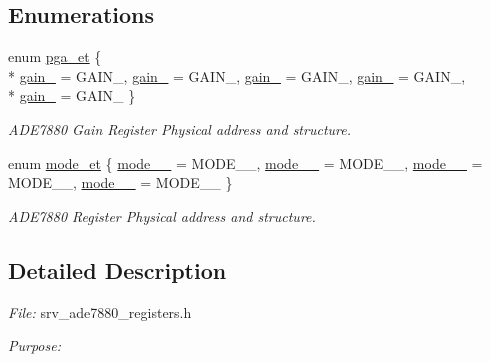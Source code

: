 \subsection*{Enumerations}
\begin{DoxyCompactItemize}
\item 
enum \hyperlink{a00036_ad9e71b7c5a4b7598dfea38b40734d96f}{pga\-\_\-et} \{ \\*
\hyperlink{a00036_ad9e71b7c5a4b7598dfea38b40734d96faf1e9db7d59697c4bc5aaf0d676ca7082}{gain\-\_} = G\-A\-I\-N\-\_, 
\hyperlink{a00036_ad9e71b7c5a4b7598dfea38b40734d96fa89a8362915be3315ce14b4d312cc057c}{gain\-\_} = G\-A\-I\-N\-\_, 
\hyperlink{a00036_ad9e71b7c5a4b7598dfea38b40734d96fa123644a6f475acf380a483a7698909eb}{gain\-\_} = G\-A\-I\-N\-\_, 
\hyperlink{a00036_ad9e71b7c5a4b7598dfea38b40734d96fa3d11d3d6aa9f04465f98def5062b3468}{gain\-\_} = G\-A\-I\-N\-\_, 
\\*
\hyperlink{a00036_ad9e71b7c5a4b7598dfea38b40734d96fabf8c0d5ad660e9a517072fa8d62baa10}{gain\-\_} = G\-A\-I\-N\-\_
 \}
\begin{DoxyCompactList}\small\item\em A\-D\-E7880 Gain Register Physical address and structure. \end{DoxyCompactList}\item 
enum \hyperlink{a00036_a2f9fad1776ad62bb8d7627582ecf8fd5}{mode\-\_\-et} \{ \hyperlink{a00036_a2f9fad1776ad62bb8d7627582ecf8fd5a1dee68c44c7100156916a6f1924dfe1d}{mode\-\_\-\_} = M\-O\-D\-E\-\_\-\_, 
\hyperlink{a00036_a2f9fad1776ad62bb8d7627582ecf8fd5a6902084e9f2215f3ad655232a365fa94}{mode\-\_\-\_} = M\-O\-D\-E\-\_\-\_, 
\hyperlink{a00036_a2f9fad1776ad62bb8d7627582ecf8fd5a94d8576ca2db3e13b94dfaf4ff333c86}{mode\-\_\-\_} = M\-O\-D\-E\-\_\-\_, 
\hyperlink{a00036_a2f9fad1776ad62bb8d7627582ecf8fd5ac640d7e945220b2b6b82511956da6e37}{mode\-\_\-\_} = M\-O\-D\-E\-\_\-\_
 \}
\begin{DoxyCompactList}\small\item\em A\-D\-E7880 Register Physical address and structure. \end{DoxyCompactList}\end{DoxyCompactItemize}


\subsection{Detailed Description}
{\itshape File\-:} srv\-\_\-ade7880\-\_\-registers.\-h \par
 {\itshape Purpose\-:} \par
 

